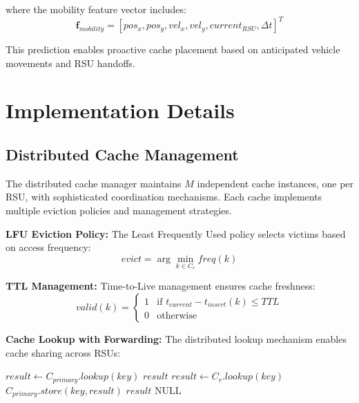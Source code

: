 \documentclass[11pt]{article}
\begin{document}
where the mobility feature vector includes:
\begin{equation}
\mathbf{f}_{mobility} = [pos_x, pos_y, vel_x, vel_y, current_{RSU}, \Delta t]^T
\end{equation}

This prediction enables proactive cache placement based on anticipated vehicle movements and RSU handoffs.

\section{Implementation Details}

\subsection{Distributed Cache Management}

The distributed cache manager maintains $M$ independent cache instances, one per RSU, with sophisticated coordination mechanisms. Each cache implements multiple eviction policies and management strategies.

\textbf{LFU Eviction Policy:} The Least Frequently Used policy selects victims based on access frequency:
\begin{equation}
evict = \arg\min_{k \in C_r} freq(k)
\end{equation}

\textbf{TTL Management:} Time-to-Live management ensures cache freshness:
\begin{equation}
valid(k) = \begin{cases}
1 & \text{if } t_{current} - t_{insert}(k) \leq TTL \\
0 & \text{otherwise}
\end{cases}
\end{equation}

\textbf{Cache Lookup with Forwarding:} The distributed lookup mechanism enables cache sharing across RSUs:

\begin{algorithm}
\caption{Distributed Cache Lookup}
\begin{algorithmic}[1]
\STATE $result \leftarrow C_{primary}.lookup(key)$
    \RETURN $result$
\ENDIF
{}
    \STATE $result \leftarrow C_r.lookup(key)$
        \STATE $C_{primary}.store(key, result)$ 
        \RETURN $result$
    \ENDIF
\ENDFOR
\RETURN $\text{NULL}$
\end{algorithmic}
\end{algorithm}
\end{document}
